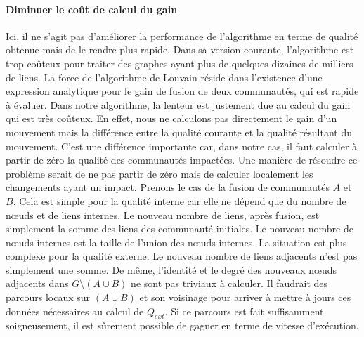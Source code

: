 \paragraph{Diminuer le coût de calcul du gain}
Ici, il ne s'agit pas d'améliorer la performance de l'algorithme en terme de qualité obtenue mais de le rendre plus rapide.
Dans sa version courante, l'algorithme est trop coûteux pour traiter des graphes ayant plus de quelques dizaines de milliers de liens.
La force de l'algorithme de Louvain réside dans l'existence d'une expression analytique pour le gain de fusion de deux communautés, qui est rapide à évaluer.
Dans notre algorithme, la lenteur est justement due au calcul du gain qui est très coûteux.
En effet, nous ne calculons pas directement le gain d'un mouvement mais la différence entre la qualité courante et la qualité résultant du mouvement.
C'est une différence importante car, dans notre cas, il faut calculer à partir de zéro la qualité des communautés impactées.
Une manière de résoudre ce problème serait de ne pas partir de zéro mais de calculer localement les changements ayant un impact.
Prenons le cas de la fusion de communautés $A$ et $B$.
Cela est simple pour la qualité interne car elle ne dépend que du nombre de n\oe{}uds et de liens internes.
Le nouveau nombre de liens, après fusion, est simplement la somme des liens des communauté initiales.
Le nouveau nombre de n\oe{}uds internes est la taille de l'union des n\oe{}uds internes.
La situation est plus complexe pour la qualité externe.
Le nouveau nombre de liens adjacents n'est pas simplement une somme.
De même, l'identité et le degré des nouveaux n\oe{}uds adjacents dans $G \setminus (A \cup B)$ ne sont pas triviaux à calculer.
Il faudrait des parcours locaux sur $(A \cup B)$ et son voisinage pour arriver à mettre à jours ces données nécessaires au calcul de $Q_{ext}$. 
Si ce parcours est fait suffisamment soigneusement, il est sûrement possible de gagner en terme de vitesse d'exécution.


